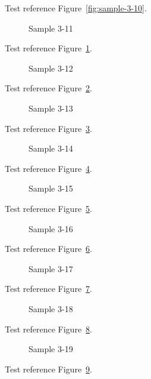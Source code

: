 Test reference Figure~\ref{fig:sample-3-10}.

\begin{figure}[tbhp]
\caption{Sample 3-11}
\label{fig:sample-3-11}
\end{figure}

Test reference Figure~\ref{fig:sample-3-11}.

\begin{figure}[tbhp]
\caption{Sample 3-12}
\label{fig:sample-3-12}
\end{figure}

Test reference Figure~\ref{fig:sample-3-12}.

\begin{figure}[tbhp]
\caption{Sample 3-13}
\label{fig:sample-3-13}
\end{figure}

Test reference Figure~\ref{fig:sample-3-13}.

\begin{figure}[tbhp]
\caption{Sample 3-14}
\label{fig:sample-3-14}
\end{figure}

Test reference Figure~\ref{fig:sample-3-14}.

\begin{figure}[tbhp]
\caption{Sample 3-15}
\label{fig:sample-3-15}
\end{figure}

Test reference Figure~\ref{fig:sample-3-15}.

\begin{figure}[tbhp]
\caption{Sample 3-16}
\label{fig:sample-3-16}
\end{figure}

Test reference Figure~\ref{fig:sample-3-16}.

\begin{figure}[tbhp]
\caption{Sample 3-17}
\label{fig:sample-3-17}
\end{figure}

Test reference Figure~\ref{fig:sample-3-17}.

\begin{figure}[tbhp]
\caption{Sample 3-18}
\label{fig:sample-3-18}
\end{figure}

Test reference Figure~\ref{fig:sample-3-18}.

\begin{figure}[tbhp]
\caption{Sample 3-19}
\label{fig:sample-3-19}
\end{figure}

Test reference Figure~\ref{fig:sample-3-19}.

